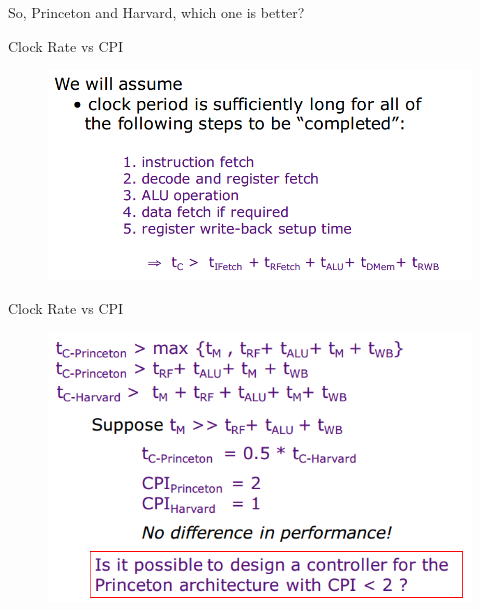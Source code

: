\documentclass[UTF8]{ctexbeamer}
\begin{document}
\begin{frame}
\begin{center}
\large So, Princeton and Harvard, which one is better?
\end{center}
\end{frame}

\begin{frame}{Clock Rate vs CPI}
\begin{figure}
\centering
\includegraphics[width=0.8\linewidth]{fig/Lecture2/clock_1.PNG}
\end{figure}
\end{frame}

\begin{frame}{Clock Rate vs CPI}
\begin{figure}
\centering
\includegraphics[width=0.8\linewidth]{fig/Lecture2/clock_rate-vs-cpi.PNG}
\end{figure}
\end{frame}
\end{document}
